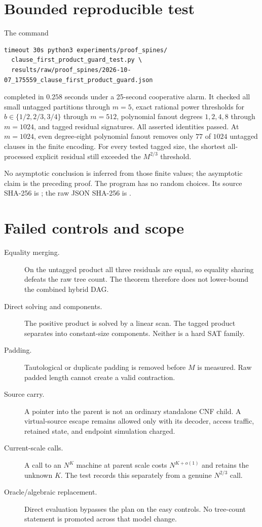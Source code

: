 \documentclass[11pt]{article}
\begin{document}
\section*{Bounded reproducible test}
The command
\begin{verbatim}
timeout 30s python3 experiments/proof_spines/
  clause_first_product_guard_test.py \
  results/raw/proof_spines/2026-10-07_175559_clause_first_product_guard.json
\end{verbatim}
completed in $0.258$ seconds under a 25-second cooperative alarm.  It checked
all small untagged partitions through $m=5$, exact rational power thresholds
for $b\in\{1/2,2/3,3/4\}$ through $m=512$, polynomial fanout degrees
$1,2,4,8$ through $m=1024$, and tagged residual signatures.  All asserted
identities passed.  At $m=1024$, even degree-eight polynomial fanout removes
only $77$ of $1024$ untagged clauses in the finite encoding.  For every tested
tagged size, the shortest all-processed explicit residual still exceeded the
$M^{2/3}$ threshold.

No asymptotic conclusion is inferred from those finite values; the asymptotic
claim is the preceding proof.  The program has no random choices.  Its source
SHA-256 is
;
the raw JSON SHA-256 is
.

\section*{Failed controls and scope}
\begin{description}
\item[Equality merging.]  On the untagged product all three residuals are
equal, so equality sharing defeats the raw tree count.  The theorem therefore
does not lower-bound the combined hybrid DAG.
\item[Direct solving and components.]  The positive product is solved by a
linear scan.  The tagged product separates into constant-size components.
Neither is a hard SAT family.
\item[Padding.]  Tautological or duplicate padding is removed before $M$ is
measured.  Raw padded length cannot create a valid contraction.
\item[Source carry.]  A pointer into the parent is not an ordinary standalone
CNF child.  A virtual-source escape remains allowed only with its decoder,
access traffic, retained state, and endpoint simulation charged.
\item[Current-scale calls.]  A call to an $N^K$ machine at parent scale costs
$N^{K+o(1)}$ and retains the unknown $K$.  The test records this separately
from a genuine $N^{2/3}$ call.
\item[Oracle/algebraic replacement.]  Direct evaluation bypasses the plan on
the easy controls.  No tree-count statement is promoted across that model
change.
\end{description}
\end{document}
